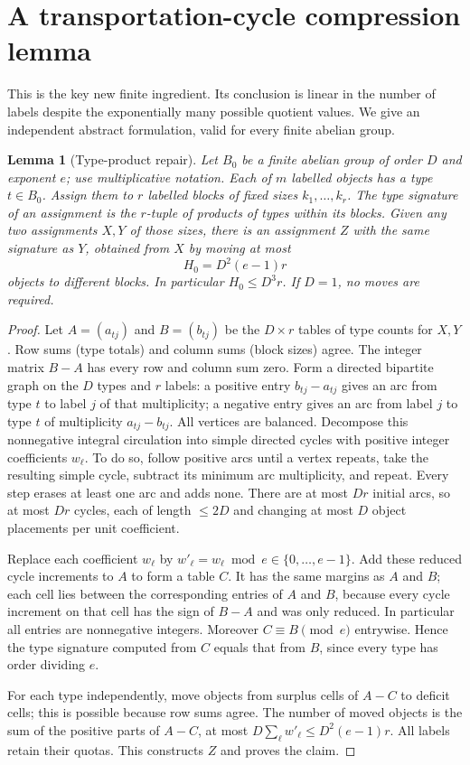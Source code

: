 \documentclass[11pt]{article}
\newtheorem{lemma}[theorem]{Lemma}
\theoremstyle{remark}\newtheorem{remark}[theorem]{Remark}
\begin{document}
\section{A transportation-cycle compression lemma}
This is the key new finite ingredient. Its conclusion is linear in the number of labels despite the exponentially many possible quotient values. We give an independent abstract formulation, valid for every finite abelian group.
\begin{lemma}[Type-product repair]\label{lem:repair}
Let $B_0$ be a finite abelian group of order $D$ and exponent $e$; use multiplicative notation. Each of $m$ labelled objects has a type $t\in B_0$. Assign them to $r$ labelled blocks of fixed sizes $k_1,\ldots,k_r$. The type signature of an assignment is the $r$-tuple of products of types within its blocks. Given any two assignments $X,Y$ of those sizes, there is an assignment $Z$ with the same signature as $Y$, obtained from $X$ by moving at most
\begin{equation}\label{eq:repair}
H_0=D^2(e-1)r
\end{equation}
objects to different blocks. In particular $H_0\le D^3r$. If $D=1$, no moves are required.
\end{lemma}
\begin{proof}
Let $A=(a_{tj})$ and $B=(b_{tj})$ be the $D\times r$ tables of type counts for $X,Y$. Row sums (type totals) and column sums (block sizes) agree. The integer matrix $B-A$ has every row and column sum zero. Form a directed bipartite graph on the $D$ types and $r$ labels: a positive entry $b_{tj}-a_{tj}$ gives an arc from type $t$ to label $j$ of that multiplicity; a negative entry gives an arc from label $j$ to type $t$ of multiplicity $a_{tj}-b_{tj}$. All vertices are balanced. Decompose this nonnegative integral circulation into simple directed cycles with positive integer coefficients $w_\ell$. To do so, follow positive arcs until a vertex repeats, take the resulting simple cycle, subtract its minimum arc multiplicity, and repeat. Every step erases at least one arc and adds none. There are at most $Dr$ initial arcs, so at most $Dr$ cycles, each of length $\le2D$ and changing at most $D$ object placements per unit coefficient.

Replace each coefficient $w_\ell$ by $w'_\ell=w_\ell\bmod e\in\{0,\ldots,e-1\}$. Add these reduced cycle increments to $A$ to form a table $C$. It has the same margins as $A$ and $B$; each cell lies between the corresponding entries of $A$ and $B$, because every cycle increment on that cell has the sign of $B-A$ and was only reduced. In particular all entries are nonnegative integers. Moreover $C\equiv B\pmod e$ entrywise. Hence the type signature computed from $C$ equals that from $B$, since every type has order dividing $e$.

For each type independently, move objects from surplus cells of $A-C$ to deficit cells; this is possible because row sums agree. The number of moved objects is the sum of the positive parts of $A-C$, at most $D\sum_\ell w'_\ell\le D^2(e-1)r$. All labels retain their quotas. This constructs $Z$ and proves the claim.
\end{proof}
\end{document}
